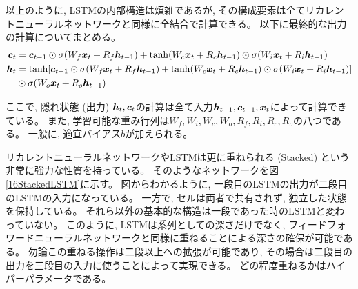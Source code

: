 以上のように, LSTMの内部構造は煩雑であるが, その構成要素は全てリカレントニューラルネットワークと同様に全結合で計算できる。
以下に最終的な出力の計算についてまとめる。
\begin{equation}
 \begin{split}
  {\mbox{\boldmath{$c$}}}_{t} 
  &= {\mbox{\boldmath{$c$}}}_{t-1} \odot  \sigma (W_f {\mbox{\boldmath{$x$}}}_t + R_f {\mbox{\boldmath{$h$}}}_{t-1}) 
  + \tanh (W_c {\mbox{\boldmath{$x$}}}_t + R_c {\mbox{\boldmath{$h$}}}_{t-1}) \odot  \sigma (W_i {\mbox{\boldmath{$x$}}}_t + R_i {\mbox{\boldmath{$h$}}}_{t-1})\\
  {\mbox{\boldmath{$h$}}}_{t} 
  &= \tanh[{\mbox{\boldmath{$c$}}}_{t-1} \odot \sigma (W_f {\mbox{\boldmath{$x$}}}_t + R_f {\mbox{\boldmath{$h$}}}_{t-1}) 
  + \tanh (W_c {\mbox{\boldmath{$x$}}}_t + R_c {\mbox{\boldmath{$h$}}}_{t-1}) \odot \sigma (W_i {\mbox{\boldmath{$x$}}}_t + R_i {\mbox{\boldmath{$h$}}}_{t-1})] \\
  &\odot \sigma (W_o {\mbox{\boldmath{$x$}}}_t + R_o {\mbox{\boldmath{$h$}}}_{t-1})
 \end{split}
\end{equation}

ここで, 隠れ状態 (出力) ${\mbox{\boldmath{$h$}}}_t,{\mbox{\boldmath{$c$}}}_t$の計算は全て入力${\mbox{\boldmath{$h$}}}_{t-1},{\mbox{\boldmath{$c$}}}_{t-1},{\mbox{\boldmath{$x$}}}_t$によって計算できている。
また, 学習可能な重み行列は$W_f, W_i, W_c, W_o, R_f, R_i, R_c, R_o$の八つである。
一般に, 適宜バイアス$b$が加えられる。

リカレントニューラルネットワークやLSTMは更に重ねられる (Stacked) という非常に強力な性質を持っている。
そのようなネットワークを図\ref{16StackedLSTM}に示す。
図からわかるように, 一段目のLSTMの出力が二段目のLSTMの入力になっている。
一方で, セルは両者で共有されず, 独立した状態を保持している。
それら以外の基本的な構造は一段であった時のLSTMと変わっていない。
このように, LSTMは系列としての深さだけでなく, フィードフォワードニューラルネットワークと同様に重ねることによる深さの確保が可能である。
勿論この重ねる操作は二段以上への拡張が可能であり, その場合は二段目の出力を三段目の入力に使うことによって実現できる。
どの程度重ねるかはハイパーパラメータである。

